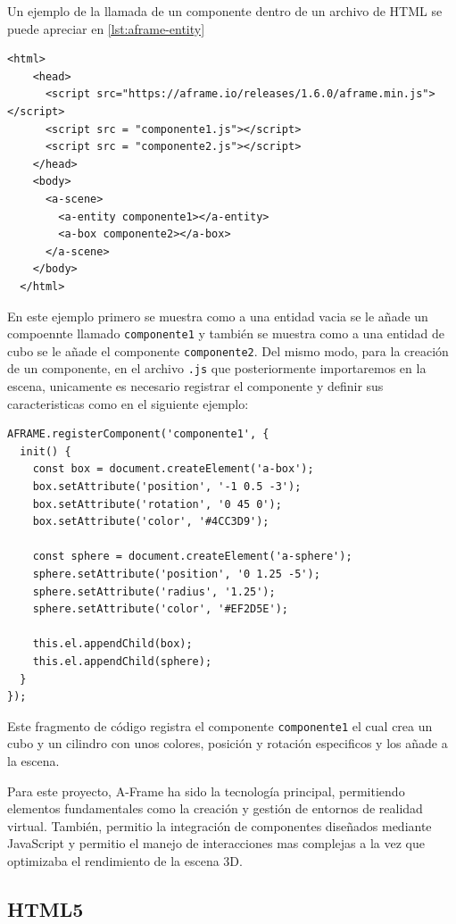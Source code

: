 \documentclass[a4paper, 12pt]{book}
\begin{document}
Un ejemplo de la llamada de un componente dentro de un archivo de HTML se puede apreciar en \ref{lst:aframe-entity}
\begin{lstlisting}[caption=Ejemplo de llamada de entidad, captionpos=b, label=lst:aframe-entity]
  <html>
    <head>
      <script src="https://aframe.io/releases/1.6.0/aframe.min.js"></script>
      <script src = "componente1.js"></script>
      <script src = "componente2.js"></script>
    </head>
    <body>
      <a-scene>
        <a-entity componente1></a-entity>
        <a-box componente2></a-box>
      </a-scene>
    </body>
  </html>
\end{lstlisting}

En este ejemplo primero se muestra como a una entidad vacia se le añade un compoennte llamado \texttt{componente1} y también se muestra como a una entidad de cubo se le añade el componente \texttt{componente2}.
Del mismo modo, para la creación de un componente, en el archivo \texttt{.js} que posteriormente importaremos en la escena, unicamente es necesario registrar el componente y definir sus caracteristicas como en el siguiente ejemplo:

\begin{lstlisting}[caption=Ejemplo de creacion de entidad, captionpos=b, label=lst:aframe-entity-creation]
  AFRAME.registerComponent('componente1', {
  init() {
    const box = document.createElement('a-box');
    box.setAttribute('position', '-1 0.5 -3');
    box.setAttribute('rotation', '0 45 0');
    box.setAttribute('color', '#4CC3D9');

    const sphere = document.createElement('a-sphere');
    sphere.setAttribute('position', '0 1.25 -5');
    sphere.setAttribute('radius', '1.25');
    sphere.setAttribute('color', '#EF2D5E');

    this.el.appendChild(box);
    this.el.appendChild(sphere);
  }
});
\end{lstlisting}

Este fragmento de código registra el componente \texttt{componente1} el cual crea un cubo y un cilindro con unos colores, posición y rotación especificos y los añade a la escena.

Para este proyecto, A-Frame ha sido la tecnología principal, permitiendo elementos fundamentales como la creación y gestión de entornos de realidad virtual. 
También, permitio la integración de componentes diseñados mediante JavaScript y permitio el manejo de interacciones mas complejas a la vez que optimizaba el rendimiento de la escena 3D.
\subsection{HTML5}
\label{subsec:HTML5}
\end{document}
